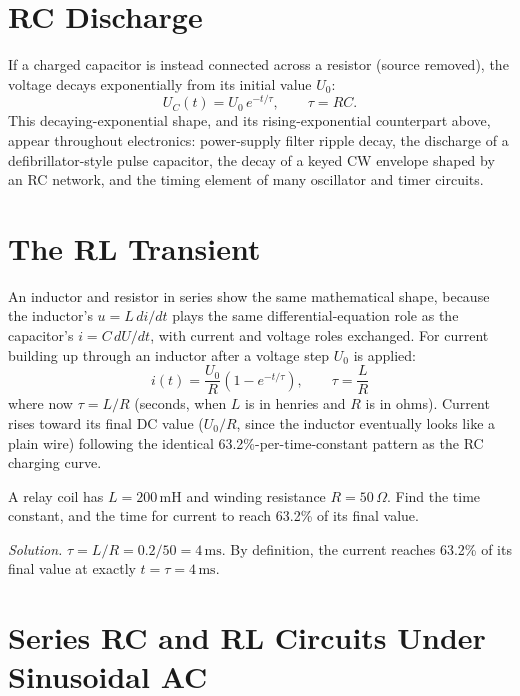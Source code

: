 \section{RC Discharge}

If a charged capacitor is instead connected across a resistor (source
removed), the voltage decays exponentially from its initial value
$U_0$:
\[
U_C(t) = U_0\,e^{-t/\tau}, \qquad \tau = RC.
\]
This decaying-exponential shape, and its rising-exponential counterpart
above, appear throughout electronics: power-supply filter ripple decay,
the discharge of a defibrillator-style pulse capacitor, the decay of a
keyed CW envelope shaped by an RC network, and the timing element of many
oscillator and timer circuits.

\section{The RL Transient}

An inductor and resistor in series show the same mathematical shape,
because the inductor's $u=L\,di/dt$ plays the same differential-equation
role as the capacitor's $i=C\,dU/dt$, with current and voltage roles
exchanged. For current building up through an inductor after a voltage
step $U_0$ is applied:
\[
i(t) = \frac{U_0}{R}\left(1 - e^{-t/\tau}\right), \qquad \tau = \frac{L}{R}
\]
where now $\tau = L/R$ (seconds, when $L$ is in henries and $R$ is in
ohms). Current rises toward its final DC value ($U_0/R$, since the
inductor eventually looks like a plain wire) following the identical
63.2\%-per-time-constant pattern as the RC charging curve.


\begin{examplebox}
A relay coil has $L = 200\,\text{mH}$ and winding resistance
$R = 50\,\Omega$. Find the time constant, and the time for current to
reach 63.2\% of its final value.

\emph{Solution.} $\tau = L/R = 0.2/50 = 4\,\text{ms}$. By definition, the
current reaches 63.2\% of its final value at exactly $t = \tau =
4\,\text{ms}$.
\end{examplebox}

\section{Series RC and RL Circuits Under Sinusoidal AC}

